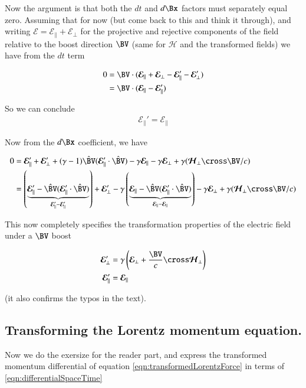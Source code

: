 \documentclass{article}
\newcommand{\EE}[0]{\boldsymbol{\mathcal{E}}}
\newcommand{\HH}[0]{\boldsymbol{\mathcal{H}}}
\newcommand{\Vcap}[0]{\hat{\BV}}
\begin{document}
Now the argument is that both the $dt$ and $d\Bx$ factors must separately equal zero.  
Assuming
that for now (but come back to this and think it through), and writing $\EE = \EE_\parallel + \EE_\perp$ for the projective
and rejective components of the field relative to the boost direction $\BV$ (same for $\HH$ and the transformed fields) we have from the $dt$ term

\begin{align*}
0 
&= \BV \cdot ( \EE_\parallel + \EE_\perp -\EE_\parallel' -\EE_\perp' ) \\
&= \BV \cdot ( \EE_\parallel -\EE_\parallel' ) \\
\end{align*}

So we can conclude
\begin{align*}
\EE_\parallel' =\EE_\parallel
\end{align*}

Now from the $d\Bx$ coefficient, we have

\begin{align*}
0 
&=
\EE_\parallel'
+\EE_\perp'
 + (\gamma-1) \Vcap (\EE_\parallel' \cdot \Vcap)
-\gamma \EE_\parallel
-\gamma \EE_\perp
+ \gamma (\HH_\perp \cross \BV/c) \\
&=
\left( \underbrace{\EE_\parallel' -\Vcap (\EE_\parallel' \cdot \Vcap)}_{\EE_\parallel' - \EE_\parallel'} \right)
+\EE_\perp'
-\gamma \left( \underbrace{\EE_\parallel - \Vcap (\EE_\parallel' \cdot \Vcap)}_{\EE_\parallel - \EE_\parallel} \right)
-\gamma \EE_\perp
+ \gamma (\HH_\perp \cross \BV/c) \\
\end{align*}

This now completely specifies the transformation properties of the electric field under a $\BV$ boost

\begin{align}\label{eqn:finalResultsForPower}
\EE_\perp' &= \gamma \left( \EE_\perp + \frac{\BV}{c} \cross \HH_\perp \right) \\
\EE_\parallel' &= \EE_\parallel
\end{align}

(it also confirms the typos in the text).

\subsection{ Transforming the Lorentz momentum equation. }

Now we do the exersize for the reader part, and express the transformed momentum differential of equation
\ref{eqn:transformedLorentzForce} in terms of \ref{eqn:differentialSpaceTime}
\end{document}
